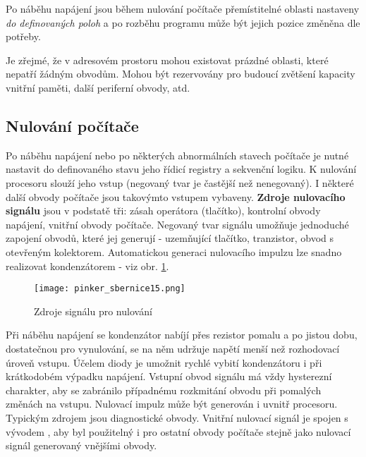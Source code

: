      
      Po náběhu napájení jsou během nulování počítače přemístitelné oblasti nastaveny \emph{do 
      definovaných poloh} a po rozběhu programu může být jejich pozice změněna dle potřeby.
      
      Je zřejmé, že v adresovém prostoru mohou existovat prázdné oblasti, které nepatří žádným 
      obvodům. Mohou být rezervovány pro budoucí zvětšení kapacity vnitřní paměti, další periferní 
      obvody, atd.
      
    \subsection{Nulování počítače}
      Po náběhu napájení nebo po některých abnormálních stavech počítače je nutné nastavit do 
      definovaného stavu jeho řídicí registry a sekvenční logiku. K nulování procesoru slouží jeho 
      vstup \texttt{} (negovaný tvar je častější než nenegovaný). I některé 
      další obvody počítače jsou takovýmto vstupem vybaveny. \textbf{Zdroje nulovacího signálu} 
      jsou v podstatě tři: zásah operátora (tlačítko), kontrolní obvody napájení, vnitřní obvody 
      počítače. Negovaný tvar signálu umožňuje jednoduché zapojení obvodů, které jej generují - 
      uzemňující tlačítko, tranzistor, obvod s otevřeným kolektorem. Automatickou generaci 
      nulovacího impulzu lze snadno realizovat kondenzátorem - viz obr. \ref{MIT:fig_sbernice15}.
      
      \begin{figure}[ht!] %
        \centering
        \texttt{[image: pinker\_sbernice15.png]}
        \caption{Zdroje signálu pro nulování}
        \label{MIT:fig_sbernice15}
      \end{figure}
      
      Při náběhu napájení se kondenzátor nabíjí přes rezistor pomalu a po jistou dobu, dostatečnou 
      pro vynulování, se na něm udržuje napětí menší než rozhodovací úroveň vstupu. Účelem diody je 
      umožnit rychlé vybití kondenzátoru i při krátkodobém výpadku napájení. Vstupní obvod signálu 
      \texttt{} má vždy hysterezní charakter, aby se zabránilo případnému 
      rozkmitání obvodu při pomalých změnách na vstupu. Nulovací impulz může být generován i uvnitř 
      procesoru. Typickým zdrojem jsou diagnostické obvody. Vnitřní nulovací signál je spojen s 
      vývodem \texttt{}, aby byl použitelný i pro ostatní obvody počítače 
      stejně jako nulovací signál generovaný vnějšími obvody.
      
